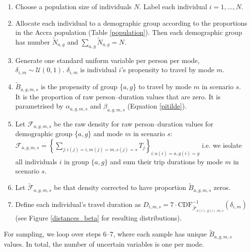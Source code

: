 \documentclass{article}
\begin{document}
\begin{appendix}
\begin{enumerate}
\item Choose a population size of individuals ${N}$. Label each individual $i=1,...,N$.
\item Allocate each individual to a demographic group according to the proportions in the Accra population (Table \ref{population}). Then each demographic group has number $\tilde{N}_{a,g}$ and  $\sum_{a,g}\tilde{N}_{a,g}=N$.
\item Generate one standard uniform variable per person per mode, $\delta_{i,m}\sim\mathcal{U}(0,1)$. $\delta_{i,m}$ is individual $i$'s propensity to travel by mode $m$. 
\item $\tilde{B}_{a,g,m,s}$ is the propensity of group \{$a,g$\} to travel by mode $m$ in scenario $s$. It is the proportion of raw person--duration values that are zero. It is parametrised by $\alpha_{a,g,m,s}$ and $\beta_{a,g,m,s}$ (Equation \ref{pitilde}). 
\item Let $\mathcal{F}_{a,g,m,s}$ be the raw density for raw person--duration values for demographic group  \{$a,g$\} and mode $m$ in scenario $s$: $\mathcal{F}_{a,g,m,s}=\left\{\sum_{j:i(j)=i,m(j)=m,s(j)=s} T_j\right\}_{i:a(i)=a,g(i)=g}$ i.e. we isolate all individuals $i$ in group $\{a,g\}$ and sum their trip durations by mode $m$ in scenario $s$.%
\item Let $\tilde{\mathcal{F}}_{a,g,m,s}$ be that density corrected to have proportion $\tilde{B}_{a,g,m,s}$ zeros.
\item Define each individual's travel duration as %
$D_{i,m,s}=7\cdot\text{CDF}_{\tilde{\mathcal{F}}_{a(i),g(i),m,s}}^{-1}(\delta_{i,m})$ (see Figure \ref{distances_beta} for resulting distributions).
\end{enumerate}

For sampling, we loop over steps 6--7, where each sample has unique $\tilde{B}_{a,g,m,s}$ values. In total, the number of uncertain variables is one per mode. 


\end{appendix}
\end{document}
